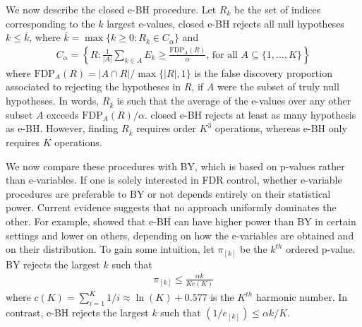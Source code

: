 \documentclass[pdflatex,sn-mathphys-num]{sn-jnl}%
\theoremstyle{thmstyleone}%
\theoremstyle{thmstyletwo}%
\theoremstyle{thmstylethree}%
\begin{document}

We now describe the closed e-BH procedure.
Let $R_k$ be the set of indices corresponding to the $k$ largest e-values, closed e-BH rejects all null hypotheses $k \leq \bar{k}$, where
$\bar k= \max \{k \geq 0: R_k \in C_\alpha \}$ and
\begin{align}
 C_\alpha = \left\{ R: \frac{1}{|A|} \sum_{k \in A} E_k \geq \frac{\mbox{FDP}_A(R)}{\alpha}  \mbox{, for all } A \subseteq \{ 1,\ldots,K \}  \right\}
\nonumber
\end{align}
where $\mbox{FDP}_A(R)= |A \cap R|/\max\{|R|, 1\}$ is the false discovery proportion associated to rejecting the hypotheses in $R$, if $A$ were the subset of truly null hypotheses.
In words, $R_{\bar k}$ is such that the average of the e-values over any other subset $A$ exceeds $\mbox{FDP}_A(R)/\alpha$.
closed e-BH %
rejects at least as many hypothesis as e-BH.
However, finding $R_{\bar k}$ requires order $K^3$ operations, whereas e-BH only requires $K$ operations.


\color{blue}
We now compare these procedures with BY, which is based on p-values rather than e-variables.
If one is solely interested in FDR control, whether e-variable procedures are preferable to BY or not depends entirely on their statistical power.
Current evidence suggests that no approach uniformly dominates the other.
For example, \cite{wang_ruodu:2022} showed that e-BH can have higher power than BY in certain settings and lower on others, depending on how the e-variables are obtained and on their distribution.
To gain some intuition, let $\pi_{[k]}$ be the $k^{th}$ ordered p-value.
BY rejects the largest $k$ such that
\begin{align}
\pi_{[k]} \leq \frac{\alpha k}{K c(K)}
\nonumber
\end{align}
where $c(K)= \sum_{i=1}^K 1/i \approx \ln(K) + 0.577$ is the $K^{th}$ harmonic number. %
In contrast, e-BH rejects the largest $k$ such that
$
(1 / e_{[k]}) \leq \alpha k/ K.
$
\end{document}

